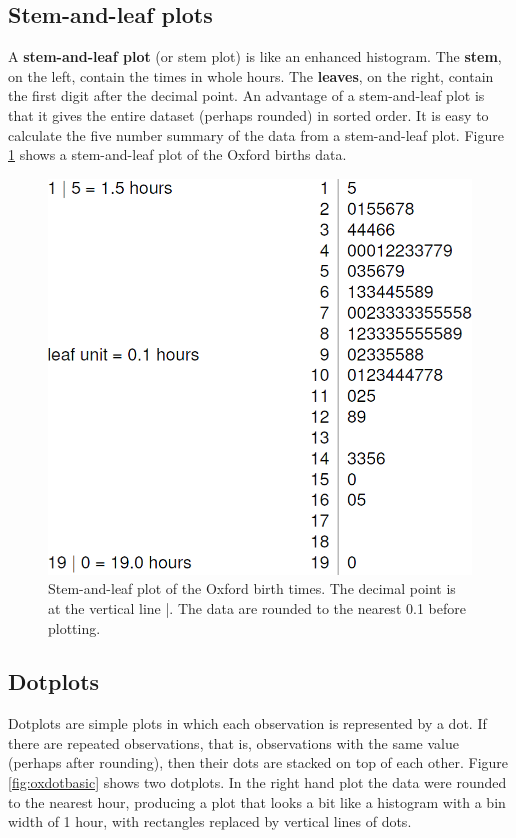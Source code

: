 \documentclass[
  11pt,
  british,
  openany, a4paper]{book}
\begin{document}
\hypertarget{stem}{%
\subsection{Stem-and-leaf plots}\label{stem}}

A \textbf{stem-and-leaf plot} (or stem plot) is like an enhanced histogram. The \textbf{stem}, on the left, contain the times in whole hours. The \textbf{leaves},
on the right, contain the first digit after the decimal point. An advantage of a stem-and-leaf plot is that it gives the entire dataset (perhaps rounded) in sorted order. It is easy to calculate the five number summary of the data from a stem-and-leaf plot. Figure \ref{fig:oxstem} shows a stem-and-leaf plot of the Oxford births data.

\begin{figure}

{\centering \includegraphics[width=0.6\linewidth]{images/ox_stem} 

}

\caption{Stem-and-leaf plot of the Oxford birth times. The decimal point is at the vertical line |. The data are rounded to the nearest 0.1 before plotting.}\label{fig:oxstem}
\end{figure}

\hypertarget{dotplots}{%
\subsection{Dotplots}\label{dotplots}}

Dotplots are simple plots in which each observation is represented by a dot. If there are repeated observations, that is, observations with the same value (perhaps after rounding), then their dots are stacked on top of each other. Figure \ref{fig:oxdotbasic} shows two dotplots. In the right hand plot the data were rounded to the nearest hour, producing a plot that looks a bit like a histogram with a bin width of 1 hour, with rectangles replaced by vertical lines of dots.
\end{document}
